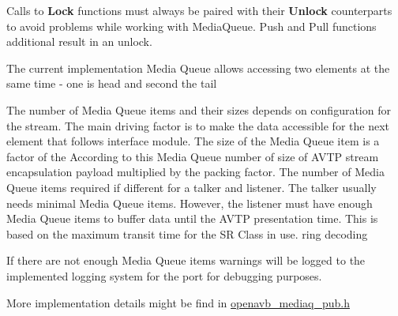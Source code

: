 \begin{DoxyItemize}
\item Calls to {\bfseries Lock} functions must always be paired with their {\bfseries Unlock} counterparts to avoid problems while working with Media\+Queue. Push and Pull functions additional result in an unlock.
\item The current implementation Media Queue allows accessing two elements at the same time -\/ one is head and second the tail
\item The number of Media Queue items and their sizes depends on configuration for the stream. The main driving factor is to make the data accessible for the next element that follows interface module. The size of the Media Queue item is a factor of the According to this Media Queue number of size of A\+V\+TP stream encapsulation payload multiplied by the packing factor. The number of Media Queue items required if different for a talker and listener. The talker usually needs minimal Media Queue items. However, the listener must have enough Media Queue items to buffer data until the A\+V\+TP presentation time. This is based on the maximum transit time for the SR Class in use. ring decoding
\item If there are not enough Media Queue items warnings will be logged to the implemented logging system for the port for debugging purposes.
\end{DoxyItemize}

More implementation details might be find in \hyperlink{mediaq_2openavb__mediaq__pub_8h}{openavb\+\_\+mediaq\+\_\+pub.\+h} 